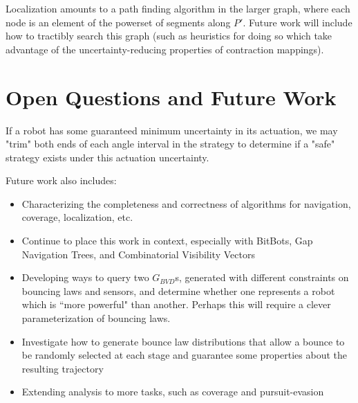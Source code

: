 \documentclass[]{styles/svproc}  %
\begin{document}
Localization amounts to a path finding algorithm in the larger graph, where each
node is an element of the powerset of segments along $P'$. Future work will
include how to tractibly search this graph (such as heuristics for doing so
which take advantage of the uncertainty-reducing properties of contraction
mappings).


\section{Open Questions and Future Work}

If a robot has some guaranteed minimum uncertainty in its actuation, we may
"trim" both ends of each angle interval in the strategy to determine if a "safe"
strategy exists under this actuation uncertainty.


Future work also includes:

\begin{itemize}
\item Characterizing the completeness and correctness of algorithms for
navigation, coverage, localization, etc.
\item Continue to place this work in context, especially with BitBots, Gap
Navigation Trees, and Combinatorial Visibility Vectors
\item Developing ways to query two $G_{BVD}$s, generated with different constraints on
 bouncing laws and sensors, and determine whether one represents a robot which
is ``more powerful" than another. Perhaps this will require a clever
parameterization of bouncing laws.
\item Investigate how to generate bounce law distributions that allow a bounce
to be randomly selected at each stage and guarantee some properties about the
resulting trajectory
\item Extending analysis to more tasks, such as coverage and pursuit-evasion
\end{itemize}
\end{document}
